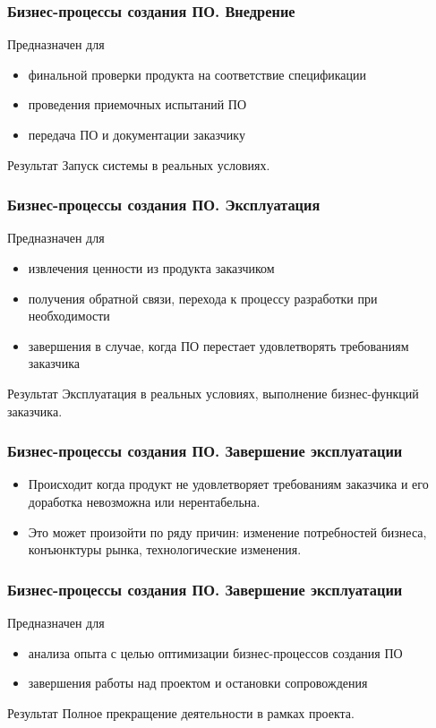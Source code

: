 \documentclass{../industrial-development}
\begin{document}
\begin{frame} \frametitle{Бизнес-процессы создания ПО. Внедрение}
	\begin{block}{Предназначен для}
		\begin{itemize}
			\item финальной проверки продукта на соответствие спецификации
			\item проведения приемочных испытаний ПО
			\item передача ПО и документации заказчику
		\end{itemize}
	\end{block}
	\begin{block}{Результат}
		Запуск системы в реальных условиях.
	\end{block}
\end{frame}
\lecturenotes


\begin{frame} \frametitle{Бизнес-процессы создания ПО. Эксплуатация}
	\begin{block}{Предназначен для}
		\begin{itemize}
			\item извлечения ценности из продукта заказчиком
			\item получения обратной связи, перехода к процессу разработки при необходимости
			\item завершения в случае, когда ПО перестает удовлетворять требованиям заказчика
		\end{itemize}
	\end{block}
	\begin{block}{Результат}
		Эксплуатация в реальных условиях, выполнение бизнес-функций заказчика.
	\end{block}
\end{frame}
\lecturenotes


\begin{frame} \frametitle{Бизнес-процессы создания ПО. Завершение эксплуатации}
	\begin{itemize}
		\item Происходит когда продукт не удовлетворяет требованиям заказчика и его доработка невозможна или нерентабельна.
		\item Это может произойти по ряду причин: изменение потребностей бизнеса, конъюнктуры рынка, технологические изменения.
	\end{itemize}
\end{frame}
\lecturenotes


\begin{frame} \frametitle{Бизнес-процессы создания ПО. Завершение эксплуатации}
	\begin{block}{Предназначен для}
		\begin{itemize}
			\item анализа опыта с целью оптимизации бизнес-процессов создания ПО
			\item завершения работы над проектом и остановки сопровождения
		\end{itemize}
	\end{block}
	\begin{block}{Результат}
		Полное прекращение деятельности в рамках проекта.
	\end{block}
\end{frame}
\lecturenotes
\end{document}
